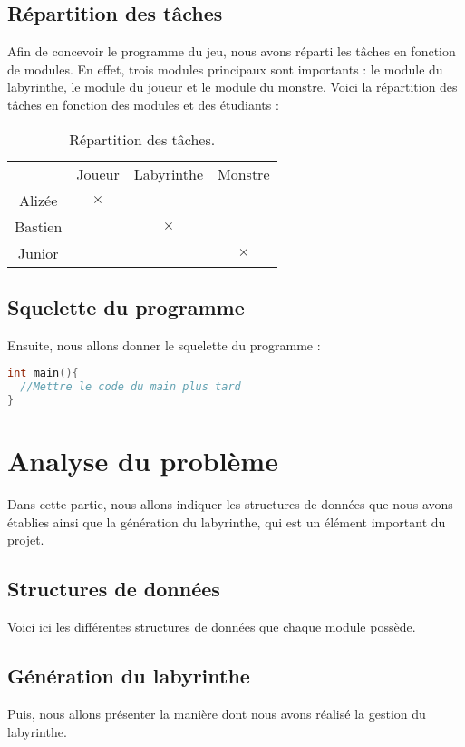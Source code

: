 \documentclass[a4paper,11pt]{report}
\begin{document}
\section{Répartition des tâches}
Afin de concevoir le programme du jeu, nous avons réparti les tâches en fonction de modules. En effet, trois modules principaux sont importants : le module du labyrinthe, le module du joueur et le module du monstre. Voici la répartition des tâches en fonction des modules et des étudiants :
\begin{table}[htbp]
  \center
  \caption{Répartition des tâches.}
  \begin{tabular}{|c|c c c|}
   \hline 
                               &Joueur    &Labyrinthe   &Monstre   \\
                       Alizée  & $\times$ &             &          \\
                       Bastien &          &$\times$     &          \\
                       Junior  &          &             &$\times$  \\
   \hline
  \end{tabular}
\end{table}
\section{Squelette du programme}
Ensuite, nous allons donner le squelette du programme :

\begin{lstlisting}[language=c]
int main(){
  //Mettre le code du main plus tard
}
\end{lstlisting}
\chapter{Analyse du problème}
Dans cette partie, nous allons indiquer les structures de données que nous avons établies ainsi que la génération du labyrinthe, qui est un élément important du projet.
\section{Structures de données}
Voici ici les différentes structures de données que chaque module possède.
\section{Génération du labyrinthe}
Puis, nous allons présenter la manière dont nous avons réalisé la gestion du labyrinthe.
\end{document}
